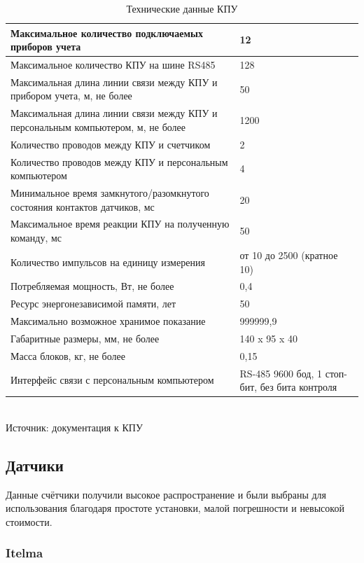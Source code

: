 \begin{table}[H]
	\caption{Технические данные КПУ} \label{tab:tab1}
	\centering
	\begin{tabular}{|p{10cm}|p{5cm}|}
		\hline 
		Максимальное количество подключаемых приборов учета & 12 \\ 
		\hline 
		Максимальное количество КПУ на шине RS485 & 128 \\ 
		\hline 
		Максимальная длина линии связи между КПУ и прибором учета, м, не более & 50 \\ 
		\hline 
		Максимальная длина линии связи между КПУ и персональным компьютером, м, не более & 1200 \\ 
		\hline
		Количество проводов между КПУ и счетчиком & 2 \\
		\hline
		Количество проводов между КПУ и персональным компьютером & 4 \\
		\hline
		Минимальное время замкнутого/разомкнутого состояния контактов датчиков, мс & 20 \\
		\hline
		Максимальное время реакции КПУ на полученную команду, мс & 50 \\
		\hline
		Количество импульсов на единицу измерения & от 10 до 2500 (кратное 10) \\
		\hline
		Потребляемая мощность, Вт, не более & 0,4 \\
		\hline
		Ресурс энергонезависимой памяти, лет & 50 \\
		\hline
		Максимально возможное хранимое показание & 999999,9 \\
		\hline
		Габаритные размеры, мм, не более & 140 x 95 x 40 \\
		\hline
		Масса блоков, кг, не более & 0,15 \\
		\hline
		Интерфейс связи с персональным компьютером & RS-485 9600 бод, 1 стоп-бит, без бита контроля \\
		\hline
	\end{tabular} 
\\Источник: документация к КПУ	
\end{table}

\subsection{Датчики}

Данные счётчики получили высокое распространение и были выбраны для использования благодаря простоте установки, малой погрешности и невысокой стоимости. 

\subsubsection{Itelma}

